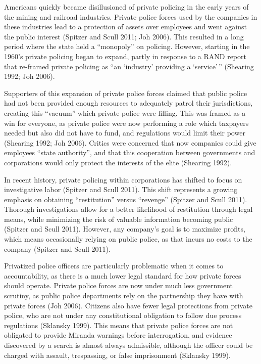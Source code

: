 \documentclass{ucetd}
\begin{document}
Americans quickly became disillusioned of private policing in the early
years of the mining and railroad industries. Private police forces used
by the companies in these industries lead to a protection of assets over
employees and went against the public interest (Spitzer and Scull 2011;
Joh 2006). This resulted in a long period where the state held a
``monopoly'' on policing. However, starting in the 1960's private
policing began to expand, partly in response to a RAND report that
re-framed private policing as ``an `industry' providing a `service'\,''
(Shearing 1992; Joh 2006).

Supporters of this expansion of private police forces claimed that
public police had not been provided enough resources to adequately
patrol their jurisdictions, creating this ``vacuum'' which private
police were filling. This was framed as a win for everyone, as private
police were now performing a role which taxpayers needed but also did
not have to fund, and regulations would limit their power (Shearing
1992; Joh 2006). Critics were concerned that now companies could give
employees ``state authority'', and that this cooperation between
governments and corporations would only protect the interests of the
elite (Shearing 1992).

In recent history, private policing within corporations has shifted to
focus on investigative labor (Spitzer and Scull 2011). This shift
represents a growing emphasis on obtaining ``restitution'' versus
``revenge'' (Spitzer and Scull 2011). Thorough investigations allow for
a better likelihood of restitution through legal means, while minimizing
the risk of valuable information becoming public (Spitzer and Scull
2011). However, any company's goal is to maximize profits, which means
occasionally relying on public police, as that incurs no costs to the
company (Spitzer and Scull 2011).

Privatized police officers are particularly problematic when it comes to
accountability, as there is a much lower legal standard for how private
forces should operate. Private police forces are now under much less
government scrutiny, as public police departments rely on the
partnership they have with private forces (Joh 2006). Citizens also have
fewer legal protections from private police, who are not under any
constitutional obligation to follow due process regulations (Sklansky
1999). This means that private police forces are not obligated to
provide Miranda warnings before interrogation, and evidence discovered
by a search is almost always admissible, although the officer could be
charged with assault, trespassing, or false imprisonment (Sklansky
1999).
\end{document}
